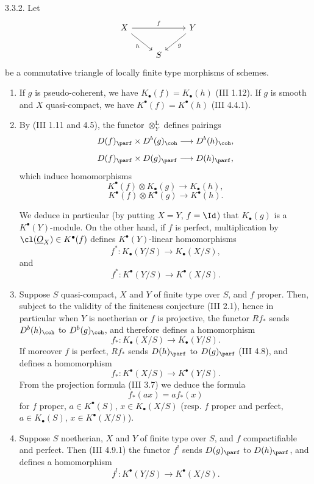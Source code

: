 3.3.2. Let
\[
\begin{tikzcd}
X\arrow[rr,"f"]\arrow[dr,"h"'] &&Y\arrow[dl,"g"]\\
&S&
\end{tikzcd}
\]
be a commutative triangle of locally finite type morphisms of schemes.
\begin{enumerate}[label=3.3.2.\arabic*., leftmargin=4em]
\item If \(g\) is pseudo-coherent, we have \(K_{\bullet}(f)=K_{\bullet}(h)\) (III 1.12). If \(g\) is smooth and \(X\) quasi-compact, we have \(K^{\bullet}(f)=K^{\bullet}(h)\) (III 4.4.1).

\item By (III 1.11 and 4.5), the functor \(\otimes_Y^{\mathrm L}\) defines pairings
\[
 D(f)_{\parf}\times D^b(g)_{\coh}\longrightarrow D^b(h)_{\coh},
\]
\[
 D(f)_{\parf}\times D(g)_{\parf}\longrightarrow D(h)_{\parf},
\]
which induce homomorphisms
\[
 K^{\bullet}(f)\otimes K_{\bullet}(g)\longrightarrow K_{\bullet}(h),
\]
\[
 K^{\bullet}(f)\otimes K^{\bullet}(g)\longrightarrow K^{\bullet}(h).
\]

%
We deduce in particular (by putting \(X=Y\), \(f=\Id\)) that \(K_{\bullet}(g)\) is a \(K^{\bullet}(Y)\)-module. On the other hand, if \(f\) is perfect, multiplication by \(\cl(\underline O_X)\in K^{\bullet}(f)\) defines \(K^{\bullet}(Y)\)-linear homomorphisms
\[
 f^*:K_{\bullet}(Y/S)\longrightarrow K_{\bullet}(X/S),
\]
and
\[
 f^*:K^{\bullet}(Y/S)\longrightarrow K^{\bullet}(X/S).
\]

\item Suppose \(S\) quasi-compact, \(X\) and \(Y\) of finite type over \(S\), and \(f\) proper. Then, subject to the validity of the finiteness conjecture (III 2.1), hence in particular when \(Y\) is noetherian or \(f\) is projective, the functor \(Rf_*\) sends \(D^b(h)_{\coh}\) to \(D^b(g)_{\coh}\), and therefore defines a homomorphism
\[
 f_*:K_{\bullet}(X/S)\longrightarrow K_{\bullet}(Y/S).
\]
If moreover \(f\) is perfect, \(Rf_*\) sends \(D(h)_{\parf}\) to \(D(g)_{\parf}\) (III 4.8), and defines a homomorphism
\[
 f_*:K^{\bullet}(X/S)\longrightarrow K^{\bullet}(Y/S).
\]
From the projection formula (III 3.7) we deduce the formula
\[
 f_*(a x)=a f_*(x)
\]
for \(f\) proper, \(a\in K^{\bullet}(S)\), \(x\in K_{\bullet}(X/S)\) (resp. \(f\) proper and perfect, \(a\in K_{\bullet}(S)\), \(x\in K^{\bullet}(X/S)\)).

\item Suppose \(S\) noetherian, \(X\) and \(Y\) of finite type over \(S\), and \(f\) compactifiable and perfect. Then (III 4.9.1) the functor \(f^!\) sends \(D(g)_{\parf}\) to \(D(h)_{\parf}\), and defines a homomorphism
\[
 f^!:K^{\bullet}(Y/S)\longrightarrow K^{\bullet}(X/S).
\]
\end{enumerate}

